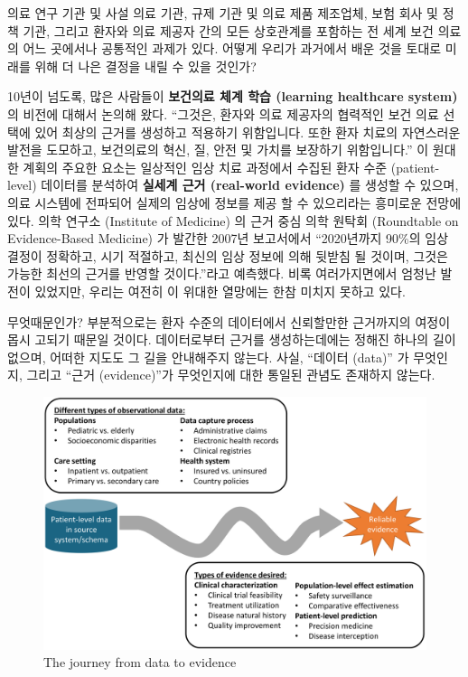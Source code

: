 \documentclass[11pt]{book}
\theoremstyle{definition}
\theoremstyle{definition}
\theoremstyle{definition}
\theoremstyle{remark}
\begin{document}
의료 연구 기관 및 사설 의료 기관, 규제 기관 및 의료 제품 제조업체, 보험
회사 및 정책 기관, 그리고 환자와 의료 제공자 간의 모든 상호관계를
포함하는 전 세계 보건 의료의 어느 곳에서나 공통적인 과제가 있다. 어떻게
우리가 과거에서 배운 것을 토대로 미래를 위해 더 나은 결정을 내릴 수 있을
것인가?

10년이 넘도록, 많은 사람들이 \textbf{보건의료 체계 학습 (learning
healthcare system)} 의 비전에 대해서 논의해 왔다. ``그것은, 환자와 의료
제공자의 협력적인 보건 의료 선택에 있어 최상의 근거를 생성하고 적용하기
위함입니다. 또한 환자 치료의 자연스러운 발전을 도모하고, 보건의료의
혁신, 질, 안전 및 가치를 보장하기 위함입니다.''\citep{olsen2007learning}
이 원대한 계획의 주요한 요소는 일상적인 임상 치료 과정에서 수집된 환자
수준 (patient-level) 데이터를 분석하여 \textbf{실세계 근거 (real-world
evidence)} 를 생성할 수 있으며, 의료 시스템에 전파되어 실제의 임상에
정보를 제공 할 수 있으리라는 흥미로운 전망에 있다. 의학 연구소
(Institute of Medicine) 의 근거 중심 의학 원탁회 (Roundtable on
Evidence-Based Medicine) 가 발간한 2007년 보고서에서 ``2020년까지 90\%의
임상 결정이 정확하고, 시기 적절하고, 최신의 임상 정보에 의해 뒷받침 될
것이며, 그것은 가능한 최선의 근거를 반영할 것이다.''라고
예측했다.\citep{olsen2007learning} 비록 여러가지면에서 엄청난 발전이
있었지만, 우리는 여전히 이 위대한 열망에는 한참 미치지 못하고 있다.

무엇때문인가? 부분적으로는 환자 수준의 데이터에서 신뢰할만한 근거까지의
여정이 몹시 고되기 때문일 것이다. 데이터로부터 근거를 생성하는데에는
정해진 하나의 길이 없으며, 어떠한 지도도 그 길을 안내해주지 않는다.
사실, ``데이터 (data)'' 가 무엇인지, 그리고 ``근거 (evidence)''가
무엇인지에 대한 통일된 관념도 존재하지 않는다.

\begin{figure}

{\centering \includegraphics[width=1\linewidth]{images/OhdsiCommunity/datajourney} 

}

\caption{The journey from data to evidence}\label{fig:datajourney}
\end{figure}
\end{document}
